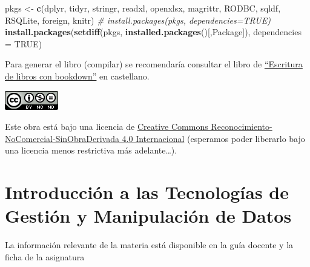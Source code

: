 \documentclass[
]{book}
\newenvironment{Shaded}{\begin{snugshade}}{\end{snugshade}}
\newcommand{\AttributeTok}[1]{\textcolor[rgb]{0.13,0.29,0.53}{#1}}
\newcommand{\CommentTok}[1]{\textcolor[rgb]{0.56,0.35,0.01}{\textit{#1}}}
\newcommand{\ConstantTok}[1]{\textcolor[rgb]{0.56,0.35,0.01}{#1}}
\newcommand{\FunctionTok}[1]{\textcolor[rgb]{0.13,0.29,0.53}{\textbf{#1}}}
\newcommand{\NormalTok}[1]{#1}
\newcommand{\OtherTok}[1]{\textcolor[rgb]{0.56,0.35,0.01}{#1}}
\newcommand{\StringTok}[1]{\textcolor[rgb]{0.31,0.60,0.02}{#1}}
\begin{document}
\begin{Shaded}
\begin{Highlighting}[]
\NormalTok{pkgs }\OtherTok{\textless{}{-}} \FunctionTok{c}\NormalTok{(}\StringTok{\textquotesingle{}dplyr\textquotesingle{}}\NormalTok{, }\StringTok{\textquotesingle{}tidyr\textquotesingle{}}\NormalTok{, }\StringTok{\textquotesingle{}stringr\textquotesingle{}}\NormalTok{, }\StringTok{\textquotesingle{}readxl\textquotesingle{}}\NormalTok{, }\StringTok{\textquotesingle{}openxlsx\textquotesingle{}}\NormalTok{, }\StringTok{\textquotesingle{}magrittr\textquotesingle{}}\NormalTok{, }
          \StringTok{\textquotesingle{}RODBC\textquotesingle{}}\NormalTok{, }\StringTok{\textquotesingle{}sqldf\textquotesingle{}}\NormalTok{, }\StringTok{\textquotesingle{}RSQLite\textquotesingle{}}\NormalTok{, }\StringTok{\textquotesingle{}foreign\textquotesingle{}}\NormalTok{, }\StringTok{\textquotesingle{}knitr\textquotesingle{}}\NormalTok{)}
\CommentTok{\# install.packages(pkgs, dependencies=TRUE)}
\FunctionTok{install.packages}\NormalTok{(}\FunctionTok{setdiff}\NormalTok{(pkgs, }\FunctionTok{installed.packages}\NormalTok{()[,}\StringTok{\textquotesingle{}Package\textquotesingle{}}\NormalTok{]), }\AttributeTok{dependencies =} \ConstantTok{TRUE}\NormalTok{)}
\end{Highlighting}
\end{Shaded}

Para generar el libro (compilar) se recomendaría consultar el libro de \href{https://rubenfcasal.github.io/bookdown_intro}{``Escritura de libros con bookdown''} en castellano.

\includegraphics{images/by-nc-nd-88x31.png}

Este obra está bajo una licencia de \href{https://creativecommons.org/licenses/by-nc-nd/4.0/deed.es_ES}{Creative Commons Reconocimiento-NoComercial-SinObraDerivada 4.0 Internacional}
(esperamos poder liberarlo bajo una licencia menos restrictiva más adelante\ldots).

\chapter{Introducción a las Tecnologías de Gestión y Manipulación de Datos}\label{introducciuxf3n-a-las-tecnologuxedas-de-gestiuxf3n-y-manipulaciuxf3n-de-datos}

La información relevante de la materia está disponible en la guía docente y la ficha de la asignatura
\end{document}
